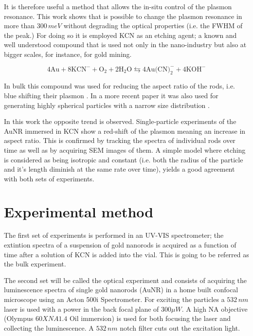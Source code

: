 \documentclass[twocolumn]{article}
\begin{document}
It is therefore useful a method that allows the in-situ control of the plasmon
resonance. This work shows that is possible to change the plasmon resonance in
more than $300\,meV$ without degrading the optical properties (i.e. the FWHM of
the peak.) For doing so it is employed KCN as an etching agent; a known and well
understood compound that is used not only in the nano-industry but also at
bigger scales, for instance, for gold mining.

\begin{equation}
4\textrm{Au} + 8\textrm{KCN}^-+\textrm{O}_2 + 2\textrm{H}_2\textrm{O}
\leftrightarrows 4\textrm{Au(CN)}_2^-+4\textrm{KOH}^-
\end{equation}

In bulk this compound was used for reducing the aspect ratio of the rods, i.e.
blue shifting their plasmon \cite{Jana2002}. In a more recent paper it was also
used for generating highly spherical particles with a narrow size
distribution \cite{Lee2013}.

In this work the opposite trend is observed. Single-particle experiments of the
AuNR immersed in KCN show a red-shift of the plasmon meaning an increase in
aspect ratio. This is confirmed by tracking the spectra of individual rods over
time as well as by acquiring SEM images of them. A simple model where etching is
considered as being isotropic and constant (i.e. both the radius of the particle
and it's length diminish at the same rate over time), yields a good agreement
with both sets of experiments. 

\section{Experimental method}
The first set of experiments is performed in an UV-VIS spectrometer; the
extintion spectra of a suspension of gold nanorods is acquired as a function of
time after a solution of KCN is added into the vial. This is going to be
referred as the bulk experiment.

The second set will be called the optical experiment and consists of acquiring
the luminescence spectra of single gold nanorods (AuNR) in a home built confocal
microscope using an Acton 500i Spectrometer. For exciting the particles a
$532\,nm$ laser is used with a power in the back focal plane of $300\mu W$. A
high NA objective (Olympus $60X NA 1.4$ Oil immersion) is used for both focusing the
laser and collecting the luminescence. A $532\,nm$ notch filter cuts out the
excitation light.
\end{document}
